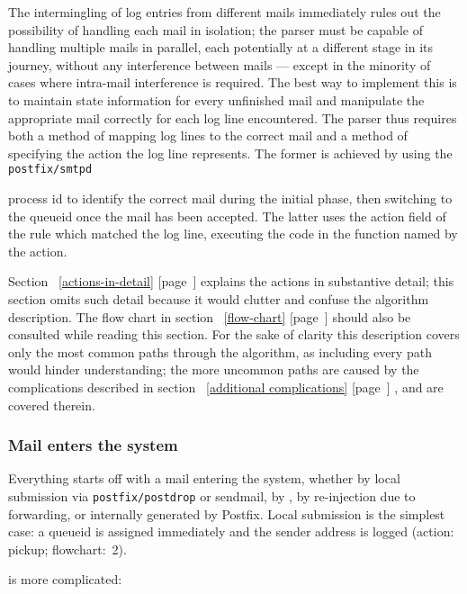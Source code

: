 \documentclass[a4paper,12pt,draft]{article}
\newcommand{\refwithpage}[1]{%
    \empty{}\ref{#1} [page~\pageref{#1}]%
}
\newcommand{\daemon}[1]{%
    \texttt{postfix/#1}%
}
\begin{document}
\label{full-algorithm}

The intermingling of log entries from different mails immediately rules out
the possibility of handling each mail in isolation; the parser must be
capable of handling multiple mails in parallel, each potentially at a
different stage in its journey, without any interference between mails ---
except in the minority of cases where intra-mail interference is required.
The best way to implement this is to maintain state information for every
unfinished mail and manipulate the appropriate mail correctly for each log
line encountered.  The parser thus requires both a method of mapping log
lines to the correct mail and a method of specifying the action the log
line represents.  The former is achieved by using the \daemon{smtpd}
process id to identify the correct mail during the initial phase, then
switching to the queueid once the mail has been accepted.  The latter uses
the action field of the rule which matched the log line, executing the code
in the function named by the action.

Section~\refwithpage{actions-in-detail} explains the actions in substantive
detail; this section omits such detail because it would clutter and confuse
the algorithm description.  The flow chart in
section~\refwithpage{flow-chart} should also be consulted while reading
this section.  For the sake of clarity this description covers only the
most common paths through the algorithm, as including every path would
hinder understanding; the more uncommon paths are caused by the
complications described in section~\refwithpage{additional complications},
and are covered therein.

\subsubsection{Mail enters the system}

\label{mail-enters-the-system}

Everything starts off with a mail entering the system, whether by local
submission via \daemon{postdrop} or sendmail, by \SMTP{}, by re-injection
due to forwarding, or internally generated by Postfix.  Local submission is
the simplest case: a queueid is assigned immediately and the sender address
is logged (action: pickup; flowchart:~2).

\SMTP{} is more complicated:
\end{document}
